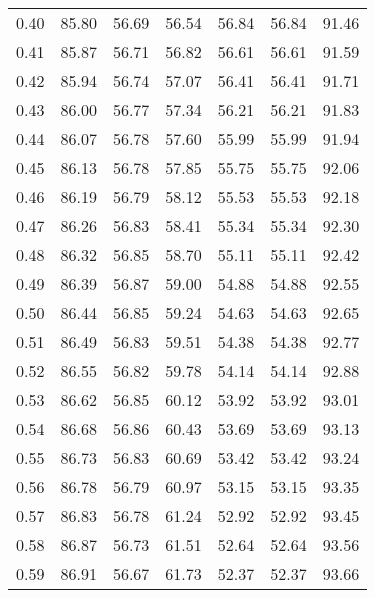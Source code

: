 \begin{tabular}{|c|c|c|c|c|c|c|}
      0.40 &     85.80 &     56.69 &      56.54 &   56.84 &      56.84 &         91.46 \\
      0.41 &     85.87 &     56.71 &      56.82 &   56.61 &      56.61 &         91.59 \\
      0.42 &     85.94 &     56.74 &      57.07 &   56.41 &      56.41 &         91.71 \\
      0.43 &     86.00 &     56.77 &      57.34 &   56.21 &      56.21 &         91.83 \\
      0.44 &     86.07 &     56.78 &      57.60 &   55.99 &      55.99 &         91.94 \\
      0.45 &     86.13 &     56.78 &      57.85 &   55.75 &      55.75 &         92.06 \\
      0.46 &     86.19 &     56.79 &      58.12 &   55.53 &      55.53 &         92.18 \\
      0.47 &     86.26 &     56.83 &      58.41 &   55.34 &      55.34 &         92.30 \\
      0.48 &     86.32 &     56.85 &      58.70 &   55.11 &      55.11 &         92.42 \\
      0.49 &     86.39 &     56.87 &      59.00 &   54.88 &      54.88 &         92.55 \\
      0.50 &     86.44 &     56.85 &      59.24 &   54.63 &      54.63 &         92.65 \\
      0.51 &     86.49 &     56.83 &      59.51 &   54.38 &      54.38 &         92.77 \\
      0.52 &     86.55 &     56.82 &      59.78 &   54.14 &      54.14 &         92.88 \\
      0.53 &     86.62 &     56.85 &      60.12 &   53.92 &      53.92 &         93.01 \\
      0.54 &     86.68 &     56.86 &      60.43 &   53.69 &      53.69 &         93.13 \\
      0.55 &     86.73 &     56.83 &      60.69 &   53.42 &      53.42 &         93.24 \\
      0.56 &     86.78 &     56.79 &      60.97 &   53.15 &      53.15 &         93.35 \\
      0.57 &     86.83 &     56.78 &      61.24 &   52.92 &      52.92 &         93.45 \\
      0.58 &     86.87 &     56.73 &      61.51 &   52.64 &      52.64 &         93.56 \\
      0.59 &     86.91 &     56.67 &      61.73 &   52.37 &      52.37 &         93.66 \\

\end{tabular}
